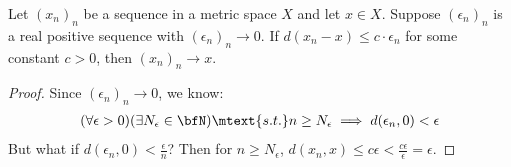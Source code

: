     \begin{lemma}
        Let $(x_n)_n$ be a sequence in a metric space $X$ and let $x \in X$. Suppose $(\epsilon_n)_n$ is a real positive sequence with $(\epsilon_n)_n \rightarrow 0$. If $d(x_n - x) \leq c \cdot \epsilon_n$ for some constant $c>0$, then $(x_n)_n \rightarrow x$.
    \end{lemma}
        \begin{proof}
            Since $(\epsilon_n)_n \rightarrow 0$, we know:
                \begin{equation*}
                \begin{split}
                    (\forall \epsilon > 0)(\exists N_\epsilon \in \bfN) \mtext{s.t.} n \geq N_\epsilon \implies d(\epsilon_n,0) < \epsilon
                \end{split}
                \end{equation*}
            But what if $d(\epsilon_n , 0) < \frac{\epsilon}{n}$? Then for $n \geq N_\epsilon$, $d(x_n,x) \leq c\epsilon < \frac{c\epsilon}{\epsilon} = \epsilon$.
        \end{proof}

